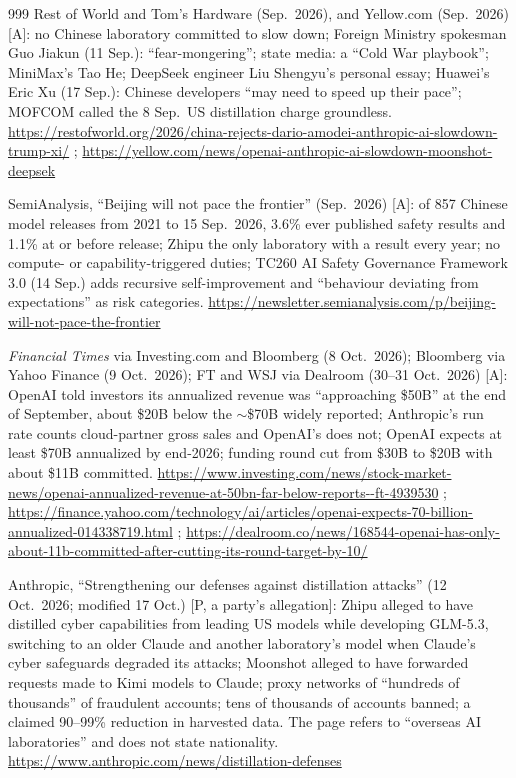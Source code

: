 \begin{thebibliography}{999}
 Rest of World and Tom's Hardware (Sep.\ 2026), and Yellow.com (Sep.\ 2026) [A]: no Chinese laboratory committed to slow down; Foreign Ministry spokesman Guo Jiakun (11 Sep.): ``fear-mongering''; state media: a ``Cold War playbook''; MiniMax's Tao He; DeepSeek engineer Liu Shengyu's personal essay; Huawei's Eric Xu (17 Sep.): Chinese developers ``may need to speed up their pace''; MOFCOM called the 8 Sep.\ US distillation charge groundless. \url{https://restofworld.org/2026/china-rejects-dario-amodei-anthropic-ai-slowdown-trump-xi/} ; \url{https://yellow.com/news/openai-anthropic-ai-slowdown-moonshot-deepsek}

 SemiAnalysis, ``Beijing will not pace the frontier'' (Sep.\ 2026) [A]: of 857 Chinese model releases from 2021 to 15 Sep.\ 2026, 3.6\% ever published safety results and 1.1\% at or before release; Zhipu the only laboratory with a result every year; no compute- or capability-triggered duties; TC260 AI Safety Governance Framework 3.0 (14 Sep.) adds recursive self-improvement and ``behaviour deviating from expectations'' as risk categories. \url{https://newsletter.semianalysis.com/p/beijing-will-not-pace-the-frontier}

 \emph{Financial Times} via Investing.com and Bloomberg (8 Oct.\ 2026); Bloomberg via Yahoo Finance (9 Oct.\ 2026); FT and WSJ via Dealroom (30--31 Oct.\ 2026) [A]: OpenAI told investors its annualized revenue was ``approaching \$50B'' at the end of September, about \$20B below the $\sim$\$70B widely reported; Anthropic's run rate counts cloud-partner gross sales and OpenAI's does not; OpenAI expects at least \$70B annualized by end-2026; funding round cut from \$30B to \$20B with about \$11B committed. \url{https://www.investing.com/news/stock-market-news/openai-annualized-revenue-at-50bn-far-below-reports--ft-4939530} ; \url{https://finance.yahoo.com/technology/ai/articles/openai-expects-70-billion-annualized-014338719.html} ; \url{https://dealroom.co/news/168544-openai-has-only-about-11b-committed-after-cutting-its-round-target-by-10/}

 Anthropic, ``Strengthening our defenses against distillation attacks'' (12 Oct.\ 2026; modified 17 Oct.) [P, a party's allegation]: Zhipu alleged to have distilled cyber capabilities from leading US models while developing GLM-5.3, switching to an older Claude and another laboratory's model when Claude's cyber safeguards degraded its attacks; Moonshot alleged to have forwarded requests made to Kimi models to Claude; proxy networks of ``hundreds of thousands'' of fraudulent accounts; tens of thousands of accounts banned; a claimed 90--99\% reduction in harvested data. The page refers to ``overseas AI laboratories'' and does not state nationality. \url{https://www.anthropic.com/news/distillation-defenses}


\end{thebibliography}
